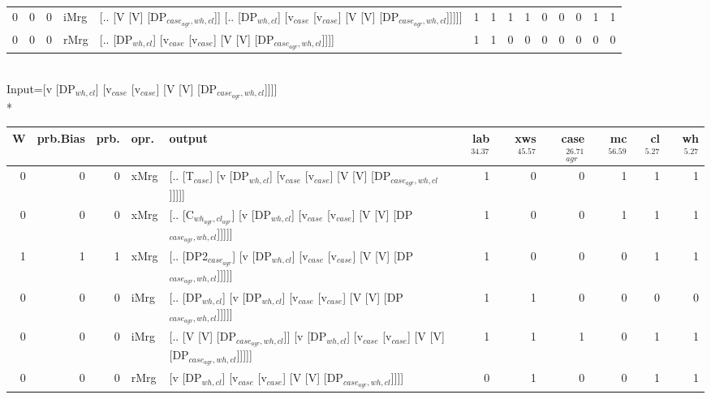 \begin{tabularx}{\linewidth}{rrrlXrrrrrrrrr}
   0 &       0 &   0 & iMrg & [.. [V [V] [DP$_{case_{agr},wh,cl}$]] [.. [DP$_{wh,cl}$] [v$_{case}$ [v$_{case}$] [V [V] [DP$_{case_{agr},wh,cl}$]]]]]                   &             1 &             1 &                  1 &            1 &              0 &                0 &             0 &        1 &        1 \\
   0 &       0 &   0 & rMrg & [.. [DP$_{wh,cl}$] [v$_{case}$ [v$_{case}$] [V [V] [DP$_{case_{agr},wh,cl}$]]]]                                                    &             1 &             1 &                  0 &            0 &              0 &                0 &             0 &        0 &        0 \\
\hline
\end{tabularx}\endgroup\\
\begingroup\scriptsize Input=[v [DP$_{wh,cl}$] [v$_{case}$ [v$_{case}$] [V [V] [DP$_{case_{agr},wh,cl}$]]]]\\*
\begin{tabularx}{\linewidth}{rrrlXrrrrrr}
\hline
   W &   prb.Bias &   prb. & opr.   & output                                                                                        &   lab$^{34.37}$ &   xws$^{45.57}$ &   case$_{agr}^{26.71}$ &   mc$^{56.59}$ &   cl$^{5.27}$ &   wh$^{5.27}$ \\
\hline
   0 &       0 &   0 & xMrg & [.. [T$_{case}$] [v [DP$_{wh,cl}$] [v$_{case}$ [v$_{case}$] [V [V] [DP$_{case_{agr},wh,cl}$]]]]]                    &             1 &             0 &                  0 &            1 &        1 &        1 \\
   0 &       0 &   0 & xMrg & [.. [C$_{wh_{agr},cl_{agr}}$] [v [DP$_{wh,cl}$] [v$_{case}$ [v$_{case}$] [V [V] [DP$_{case_{agr},wh,cl}$]]]]]           &             1 &             0 &                  0 &            1 &        1 &        1 \\
   1 &       1 &   1 & xMrg & [.. [DP2$_{case_{agr}}$] [v [DP$_{wh,cl}$] [v$_{case}$ [v$_{case}$] [V [V] [DP$_{case_{agr},wh,cl}$]]]]]              &             1 &             0 &                  0 &            0 &        1 &        1 \\
   0 &       0 &   0 & iMrg & [.. [DP$_{wh,cl}$] [v [DP$_{wh,cl}$] [v$_{case}$ [v$_{case}$] [V [V] [DP$_{case_{agr},wh,cl}$]]]]]                  &             1 &             1 &                  0 &            0 &        0 &        0 \\
   0 &       0 &   0 & iMrg & [.. [V [V] [DP$_{case_{agr},wh,cl}$]] [v [DP$_{wh,cl}$] [v$_{case}$ [v$_{case}$] [V [V] [DP$_{case_{agr},wh,cl}$]]]]] &             1 &             1 &                  1 &            0 &        1 &        1 \\
   0 &       0 &   0 & rMrg & [v [DP$_{wh,cl}$] [v$_{case}$ [v$_{case}$] [V [V] [DP$_{case_{agr},wh,cl}$]]]]                                  &             0 &             1 &                  0 &            0 &        1 &        1 \\
\hline
\end{tabularx}\endgroup\\
